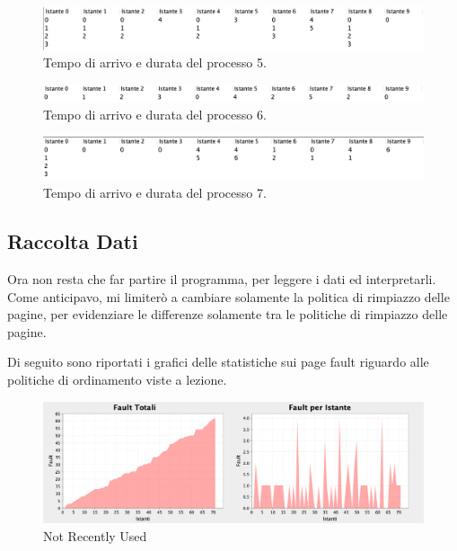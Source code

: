 \documentclass[12px]{article}
\begin{document}
    \begin{figure}[!h]
        \centering
        \includegraphics[scale=0.3]{img/5}
        \caption{Tempo di arrivo e durata del processo 5.}
    \end{figure}

    \begin{figure}[!h]
        \centering
        \includegraphics[scale=0.3]{img/6}
        \caption{Tempo di arrivo e durata del processo 6.}
    \end{figure}

    \begin{figure}[!h]
        \centering
        \includegraphics[scale=0.3]{img/7}
        \caption{Tempo di arrivo e durata del processo 7.}
    \end{figure}

\subsection{Raccolta Dati}
Ora non resta che far partire il programma, per leggere i dati ed interpretarli. Come anticipavo, mi limiterò a cambiare solamente la politica di rimpiazzo delle pagine, per evidenziare le differenze solamente tra le politiche di rimpiazzo delle pagine.

Di seguito sono riportati i grafici delle statistiche sui page fault riguardo alle politiche di ordinamento viste a lezione.

\begin{figure}[!h]
	\centering
	\includegraphics[scale=0.3]{img/nru}
	\caption{Not Recently Used}
    \label{fig:NRU}
\end{figure}
\end{document}
